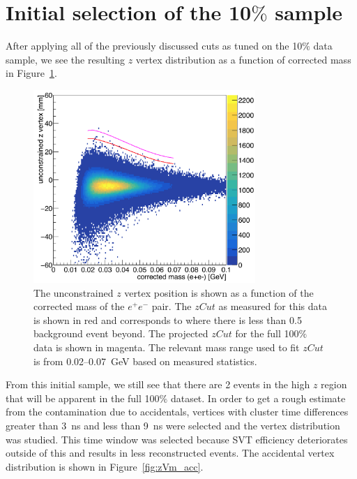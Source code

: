 \section{Initial selection of the 10$\%$ sample}
After applying all of the previously discussed cuts as tuned on the 10$\%$ data sample, we see the resulting $z$ vertex distribution as a function of corrected mass in Figure~\ref{fig:zVm_bl}.
\begin{figure}[htb]
  \centering
      \includegraphics[width=0.75\textwidth]{pics/searching/zVm_bl_L1L1.png}
  \caption[Vertex position vs mass for the 10$\%$ L1L1 data]{The unconstrained $z$ vertex position is shown as a function of the corrected mass of the $e^+e^-$ pair. The $zCut$ as measured for this data is shown in red and corresponds to where there is less than 0.5 background event beyond. The projected $zCut$ for the full 100$\%$ data is shown in magenta. The relevant mass range used to fit $zCut$ is from 0.02--0.07~GeV based on measured statistics.}
  \label{fig:zVm_bl}
\end{figure} 
From this initial sample, we still see that there are 2 events in the high $z$ region that will be apparent in the full 100$\%$ dataset. In order to get a rough estimate from the contamination due to accidentals, vertices with cluster time differences greater than 3~ns and less than 9~ns were selected and the vertex distribution was studied. This time window was selected because SVT efficiency deteriorates outside of this and results in less reconstructed events. The accidental vertex distribution is shown in Figure~\ref{fig:zVm_acc}.
